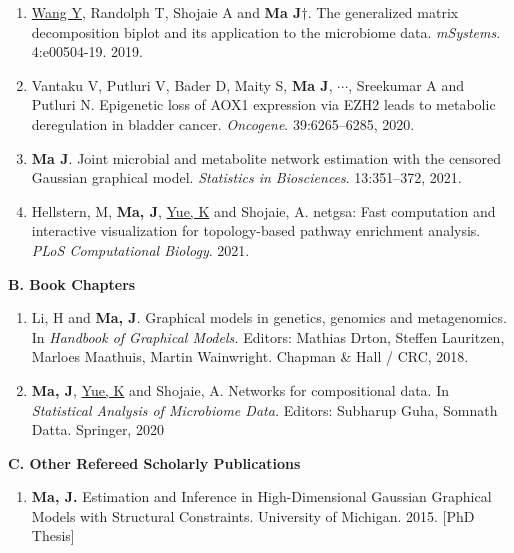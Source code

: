 \documentclass[10pt]{article}
\begin{document}
\begin{enumerate}
 \item \underline{Wang Y}, Randolph T, Shojaie A and \textbf{Ma J}{$\dagger$}. The generalized matrix decomposition biplot and its application to the microbiome data. {\em mSystems}. 4:e00504-19. 2019.
 \item Vantaku V, Putluri V, Bader D, Maity S, \textbf{Ma J}, $\cdots$, Sreekumar A and Putluri N. Epigenetic loss of AOX1 expression via EZH2 leads to metabolic deregulation in bladder cancer. {\em Oncogene}. 39:6265--6285, 2020.   
 \item \textbf{Ma J}. Joint microbial and metabolite network estimation with the censored Gaussian graphical model. {\em Statistics in Biosciences}. 13:351--372, 2021.
\item Hellstern, M, \textbf{Ma, J}, \underline{Yue, K} and Shojaie, A. netgsa: Fast computation and interactive visualization for topology-based pathway enrichment analysis. {\it PLoS Computational Biology}. 2021.
\end{enumerate}

\textbf{B. Book Chapters}
\begin{enumerate}
\item Li, H and \textbf{Ma, J}. Graphical models in genetics, genomics and metagenomics. In {\em Handbook of Graphical Models.} Editors: Mathias Drton, Steffen Lauritzen, Marloes Maathuis, Martin Wainwright. Chapman \& Hall / CRC, 2018.
\item \textbf{Ma, J}, \underline{Yue, K} and Shojaie, A. Networks for compositional data. In \emph{Statistical Analysis of Microbiome Data.} Editors: Subharup Guha, Somnath Datta. Springer, 2020
\end{enumerate}

\textbf{C. Other Refereed Scholarly Publications}
\begin{enumerate}
\item \textbf{Ma, J.} Estimation and Inference in High-Dimensional Gaussian Graphical Models  with Structural Constraints. University of Michigan. 2015. [PhD Thesis]
\end{enumerate}
\end{document}
